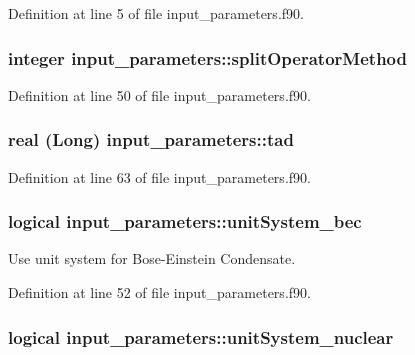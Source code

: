 Definition at line 5 of file input\_\-parameters.f90.

\hypertarget{namespaceinput__parameters_a127f71f45eade1f05ced1535e88c771d}{
\subsubsection[{splitOperatorMethod}]{\setlength{\rightskip}{0pt plus 5cm}integer {\bf input\_\-parameters::splitOperatorMethod}}}
\label{namespaceinput__parameters_a127f71f45eade1f05ced1535e88c771d}


Definition at line 50 of file input\_\-parameters.f90.

\hypertarget{namespaceinput__parameters_ab3ac3c45168fc6aafd02e70822154417}{
\subsubsection[{tad}]{\setlength{\rightskip}{0pt plus 5cm}real (Long) {\bf input\_\-parameters::tad}}}
\label{namespaceinput__parameters_ab3ac3c45168fc6aafd02e70822154417}


Definition at line 63 of file input\_\-parameters.f90.

\hypertarget{namespaceinput__parameters_a716cb07ce1fca722dacc327ddc4011fd}{
\subsubsection[{unitSystem\_\-bec}]{\setlength{\rightskip}{0pt plus 5cm}logical {\bf input\_\-parameters::unitSystem\_\-bec}}}
\label{namespaceinput__parameters_a716cb07ce1fca722dacc327ddc4011fd}


Use unit system for Bose-\/Einstein Condensate. 



Definition at line 52 of file input\_\-parameters.f90.

\hypertarget{namespaceinput__parameters_a65ef9c71ef768c5f3b871cae9143108e}{
\subsubsection[{unitSystem\_\-nuclear}]{\setlength{\rightskip}{0pt plus 5cm}logical {\bf input\_\-parameters::unitSystem\_\-nuclear}}}
\label{namespaceinput__parameters_a65ef9c71ef768c5f3b871cae9143108e}


